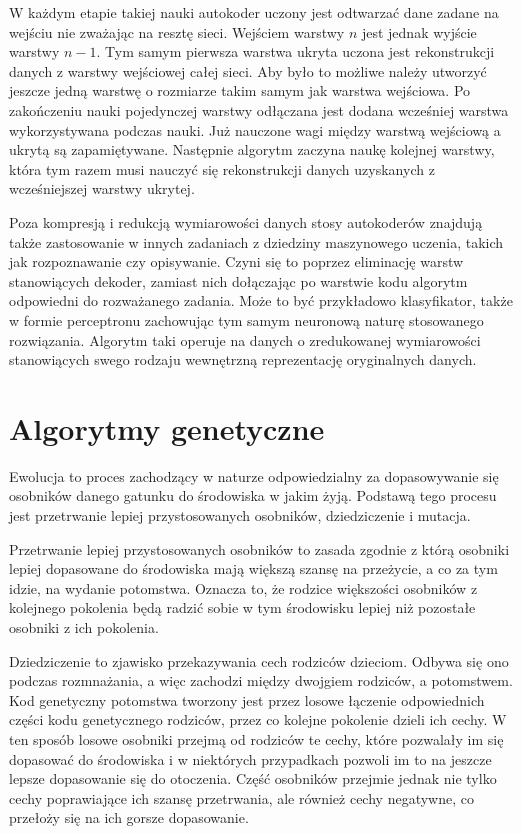 \documentclass[11pt,a4paper,oneside]{report}
\begin{document}
W każdym etapie takiej nauki autokoder uczony jest odtwarzać dane zadane na wejściu nie zważając na resztę sieci. Wejściem warstwy $n$ jest jednak wyjście warstwy $n-1$. Tym samym pierwsza warstwa ukryta uczona jest rekonstrukcji danych z warstwy wejściowej całej sieci. Aby było to możliwe należy utworzyć jeszcze jedną warstwę o rozmiarze takim samym jak warstwa wejściowa. Po zakończeniu nauki pojedynczej warstwy odłączana jest dodana wcześniej warstwa wykorzystywana podczas nauki. Już nauczone wagi między warstwą wejściową a ukrytą są zapamiętywane. Następnie algorytm zaczyna naukę kolejnej warstwy, która tym razem musi nauczyć się rekonstrukcji danych uzyskanych z wcześniejszej warstwy ukrytej.

Poza kompresją i redukcją wymiarowości danych stosy autokoderów znajdują także zastosowanie w innych zadaniach z dziedziny maszynowego uczenia, takich jak rozpoznawanie czy opisywanie. Czyni się to poprzez eliminację warstw stanowiących dekoder, zamiast nich dołączając po warstwie kodu algorytm odpowiedni do rozważanego zadania. Może to być przykładowo klasyfikator, także w formie perceptronu zachowując tym samym neuronową naturę stosowanego rozwiązania. Algorytm taki operuje na danych o zredukowanej wymiarowości stanowiących swego rodzaju wewnętrzną reprezentację oryginalnych danych. 

\section{Algorytmy genetyczne}

Ewolucja to proces zachodzący w naturze odpowiedzialny za dopasowywanie się osobników danego gatunku do środowiska w jakim żyją. Podstawą tego procesu jest przetrwanie lepiej przystosowanych osobników, dziedziczenie i mutacja.

Przetrwanie lepiej przystosowanych osobników to zasada zgodnie z którą osobniki lepiej dopasowane do środowiska mają większą szansę na przeżycie, a co za tym idzie, na wydanie potomstwa. Oznacza to, że rodzice większości osobników z kolejnego pokolenia będą radzić sobie w tym środowisku lepiej niż pozostałe osobniki z ich pokolenia.

Dziedziczenie to zjawisko przekazywania cech rodziców dzieciom. Odbywa się ono podczas rozmnażania, a więc zachodzi między dwojgiem rodziców, a potomstwem. Kod genetyczny potomstwa tworzony jest przez losowe łączenie odpowiednich części kodu genetycznego rodziców, przez co kolejne pokolenie dzieli ich cechy. W ten sposób losowe osobniki przejmą od rodziców te cechy, które pozwalały im się dopasować do środowiska i w niektórych przypadkach pozwoli im to na jeszcze lepsze dopasowanie się do otoczenia. Część osobników przejmie jednak nie tylko cechy poprawiające ich szansę przetrwania, ale również cechy negatywne, co przełoży się na ich gorsze dopasowanie.
\end{document}
